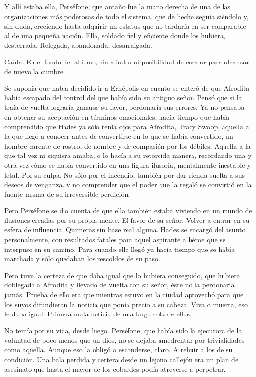 Y allí estaba ella, Perséfone, que antaño fue la mano derecha de una de las organizaciones más poderosas de todo el sistema, que de hecho seguía siéndolo y, sin duda, creciendo hasta adquirir un estatus que no tardaría en ser comparable al de una pequeña nación. Ella, soldado fiel y eficiente donde los hubiera, desterrada. Relegada, abandonada, desarraigada.

Caída. En el fondo del abismo, sin aliados ni posibilidad de escalar para alcanzar de nuevo la cumbre.

Se suponía que había decidido ir a Ernépolis en cuanto se enteró de que Afrodita había escapado del control del que había sido su antiguo señor. Pensó que si la traía de vuelta lograría ganarse su favor, perdonaría sus errores. Ya no pensaba en obtener su aceptación en términos emocionales, hacía tiempo que había comprendido que Hades ya sólo tenía ojos para Afrodita, Tracy Swoop, aquella a la que llegó a conocer antes de convertirse en lo que se había convertido, un hombre carente de rostro, de nombre y de compasión por los débiles. Aquella a la que tal vez ni siquiera amaba, o lo hacía a su retorcida manera, recordando una y otra vez cómo se había convertido en una figura ilusoria, mentalmente inestable y letal. Por su culpa. No sólo por el incendio, también por dar rienda suelta a sus deseos de venganza, y no comprender que el poder que la regaló se convirtió en la fuente misma de su irreversible perdición.

Pero Perséfone se dio cuenta de que ella también estaba viviendo en un mundo de ilusiones creadas por su propia mente. El favor de su señor. Volver a entrar en su esfera de influencia. Quimeras sin base real alguna. Hades se encargó del asunto personalmente, con resultados fatales para aquel aspirante a héroe que se interpuso en su camino. Para cuando ella llegó ya hacía tiempo que se había marchado y sólo quedaban los rescoldos de su paso.

Pero tuvo la certeza de que daba igual que lo hubiera conseguido, que hubiera doblegado a Afrodita y llevado de vuelta con su señor, éste no la perdonaría jamás. Prueba de ello era que mientras estuvo en la ciudad aprovechó para que los suyos difundieran la noticia que ponía precio a su cabeza. Viva o muerta, eso le daba igual. Primera mala noticia de una larga cola de ellas.

No temía por su vida, desde luego. Perséfone, que había sido la ejecutora de la voluntad de poco menos que un dios, no se dejaba amedrentar por trivialidades como aquella. Aunque eso la obligó a esconderse, claro. A rehuir a los de su condición. Una bala perdida y certera desde un lejano callejón era un plan de asesinato que hasta el mayor de los cobardes podía atreverse a perpetrar.

